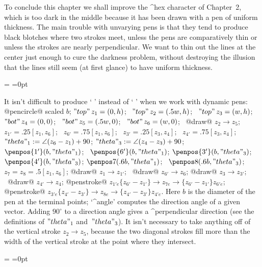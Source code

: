 \danger To conclude this chapter we shall improve the ^{hex} character
{\manual\hexb} of Chapter~2, which is too dark in the middle because it has
been drawn with a pen of uniform thickness. The main trouble with unvarying
pens is that they tend to produce black blotches where two strokes meet,
unless the pens are comparatively thin or unless the strokes are nearly
perpendicular. We want to thin out the lines at the center just enough
to cure the darkness problem, without destroying the illusion that the lines
still seem (at first glance) to have uniform thickness.

=
=0pt

\danger \strut{}%
It isn't difficult to produce `\thinspace
{\manual\hexe\hexe\hexe\hexe\hexe\hexe\hexe\hexe\hexe\hexe}\thinspace'
instead of `\thinspace
{\manual\hexb\hexb\hexb\hexb\hexb\hexb\hexb\hexb\hexb\hexb}\thinspace'
when we work with dynamic pens:
\begindisplay
\pickup @pencircle@ scaled $b$;\cr
$"top"\,z_1=(0,h)$; \ $"top"\,z_2=(.5w,h)$; \ $"top"\,z_3=(w,h)$;\cr
$"bot"\,z_4=(0,0)$; \ $"bot"\,z_5=(.5w,0)$; \ $"bot"\,z_6=(w,0)$; \
 @draw@ $z_2\to z_5$;\cr
$z_{1'}=.25[z_1,z_6]$; \ $z_{6'}=.75[z_1,z_6]$; \
$z_{3'}=.25[z_3,z_4]$; \ $z_{4'}=.75[z_3,z_4]$;\cr
$"theta"_1:=\angle(z_6-z_1)+90$;\cr
$"theta"_3:=\angle(z_4-z_3)+90$;\cr
$\penpos{1'}(b,"theta"_1)$; \ $\penpos{6'}(b,"theta"_1)$;\cr
$\penpos{3'}(b,"theta"_3)$; \ $\penpos{4'}(b,"theta"_3)$;\cr
$\penpos7(.6b,"theta"_1)$; \ $\penpos8(.6b,"theta"_3)$;\cr
$z_7=z_8=.5[z_1,z_6]$;\cr
@draw@ $z_1\to z_{1'}$; \ @draw@ $z_{6'}\to z_6$;\cr
@draw@ $z_3\to z_{3'}$; \ @draw@ $z_{4'}\to z_4$;\cr
@penstroke@ $z_{1'e}\{z_{6'}-z_{1'}\}\to z_{7e}\to\{z_{6'}-z_{1'}\}z_{6'e}$;\cr
@penstroke@ $z_{3'e}\{z_{4'}-z_{3'}\}\to z_{8e}\to\{z_{4'}-z_{3'}\}z_{4'e}$.\cr
\enddisplay
Here $b$ is the diameter of the pen at the terminal points;
`^{angle}' computes the direction angle of a given vector.
Adding $90^\circ$ to a direction angle gives a ^{perpendicular}
direction (see the definitions of $"theta"_1$ and~$"theta"_3$).
It isn't necessary to take anything off of the vertical stroke $z_2\to z_5$,
because the two diagonal strokes fill more than the width of the vertical
stroke at the point where they intersect.

=
\dp0=0pt

